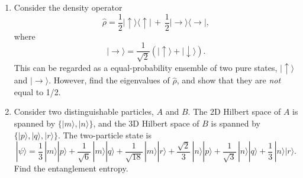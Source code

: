 \documentclass[prx,12pt]{revtex4-2}
\begin{document}
\begin{enumerate}
\begin{enumerate}[(a)]
\end{enumerate}


  

\item Consider the density operator
  \begin{equation}
    \hat{\rho} = \frac{1}{2} |\!\uparrow\rangle \langle\uparrow\!|
    \,+\, \frac{1}{2} |\!\rightarrow\rangle \langle\rightarrow\!|,
    \label{den}
  \end{equation}
  where
  \begin{equation}
    |\!\rightarrow\rangle = \frac{1}{\sqrt{2}} \left(|\!\uparrow\rangle +
  |\!\downarrow\rangle\right).
  \end{equation}
  This can be regarded as a equal-probability ensemble of two pure
  states, $|\!\uparrow\rangle$ and $|\!\rightarrow\rangle$.  However,
  find the eigenvalues of $\hat{\rho}$, and show that they are
  \textit{not} equal to 1/2.
  \label{ex:rho_decomp}

\item 
  Consider two distinguishable particles, $A$ and $B$.  The 2D Hilbert
  space of $A$ is spanned by $\{|m\rangle, |n\rangle\}$, and the
  3D Hilbert space of $B$ is spanned by $\{|p\rangle, |q\rangle,
  |r\rangle\}$.  The two-particle state is
\begin{equation}
  |\psi\rangle = \frac{1}{3} \, |m\rangle|p\rangle
+ \frac{1}{\sqrt{6}} \, |m\rangle|q\rangle
+ \frac{1}{\sqrt{18}} \, |m\rangle|r\rangle
+ \frac{\sqrt{2}}{3} \, |n\rangle|p\rangle
+ \frac{1}{\sqrt{3}} \, |n\rangle|q\rangle
+ \frac{1}{3} \, |n\rangle|r\rangle.
\end{equation}
Find the entanglement entropy.

\end{enumerate}
\end{document}
